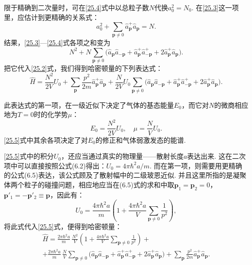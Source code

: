 限于精确到二次量时，可在\eqref{25.4}式中以总粒子数$N$代换$a_{0}^{2}=N_{0}$. 在\eqref{25.3}这一项里，应估计到更精确的关系式：
\begin{equation*}
a_{0}^{2}+\sum_{\bm{p}\neq 0}\hat{a}^{+}_{\bm{p}}\hat{a}_{\bm{p}}=N.
\end{equation*}
结果，\eqref{25.3}—\eqref{25.4}式各项之和变为
\begin{equation*}
N^{2}+N\sum_{\bm{p}\neq 0}\bigl(\hat{a}_{\bm{p}}\hat{a}_{-\bm{p}}
+\hat{a}^{+}_{\bm{p}}\hat{a}^{+}_{-\bm{p}}+2\hat{a}^{+}_{\bm{p}}\hat{a}_{\bm{p}}\bigr).
\end{equation*}
把它代入\eqref{25.2}式，我们得到哈密顿量的下列表达式：
\begin{equation}
\hat{H}=\frac{N^{2}}{2V}U_{0}
+\sum_{\bm{p}}\frac{p^{2}}{2m}\hat{a}^{+}_{\bm{p}}\hat{a}_{\bm{p}}
+\frac{N}{2V}U_{0}\sum_{\bm{p}\neq 0}\bigl(\hat{a}_{\bm{p}}\hat{a}_{-\bm{p}}
+\hat{a}^{+}_{\bm{p}}\hat{a}^{+}_{-\bm{p}}+2\hat{a}^{+}_{\bm{p}}\hat{a}_{\bm{p}}\bigr).
\label{25.5}
\end{equation}

此表达式的第一项，在一级近似下决定了气体的基态能量$E_{0}$，而它对$N$的微商相应地为$T=0$时的化学势$\mu$：
\begin{equation}
E_{0}=\frac{N^{2}}{2V}U_{0},\quad\mu=\frac{N}{V}U_{0}.
\label{25.6}
\end{equation}
\eqref{25.5}式中其余各项决定了对$E_{0}$的修正和气体弱激发态的能谱.

\eqref{25.5}式中的积分$U_{0}$，还应当通过真实的物理量——散射长度$a$表达出来. 这在二次项中可以直接按照公式(6.2)得出：$U_{0}=4\pi\hbar^{2}a/m$. 而在第一项，则需要用更精确的公式(6.5)表达，该公式顾及了散射幅中的二级玻恩近似. 并且这里所指的是凝聚体两个粒子的碰撞问题，相应地应当在(6.5)式的求和中取$\bm{p}_{1}=\bm{p}_{2}=0$，$\bm{p}'_{1}=-\bm{p}'_{2}\equiv\bm{p}$，因此有：
\begin{equation*}
U_{0}=\frac{4\pi\hbar^{2}a}{m}\left(1+\frac{4\pi\hbar^{2}a}{V}\sum_{\bm{p}\neq 0}\frac{1}{p^{2}}\right),
\end{equation*}
将此式代入\eqref{25.5}式，便得到哈密顿量：
\begin{equation}
\begin{split}
\hat{H}=\frac{2\pi\hbar^{2}a}{m}\,\frac{N^{2}}{V}
\left(1+\frac{4\pi\hbar^{2}a}{V}\sum_{\bm{p}\neq 0}\frac{1}{p^{2}}\right)+{}\\
+\frac{2\pi\hbar^{2}a}{m}\,\frac{N}{V}\sum_{\bm{p}\neq 0}
\bigl(\hat{a}_{\bm{p}}\hat{a}_{-\bm{p}}+\hat{a}^{+}_{\bm{p}}\hat{a}^{+}_{-\bm{p}}
+2\hat{a}^{+}_{\bm{p}}\hat{a}_{\bm{p}}\bigr)
+\sum_{\bm{p}}\frac{p^{2}}{2m}\hat{a}^{+}_{\bm{p}}\hat{a}_{\bm{p}}.
\end{split}
\label{25.7}
\end{equation}

